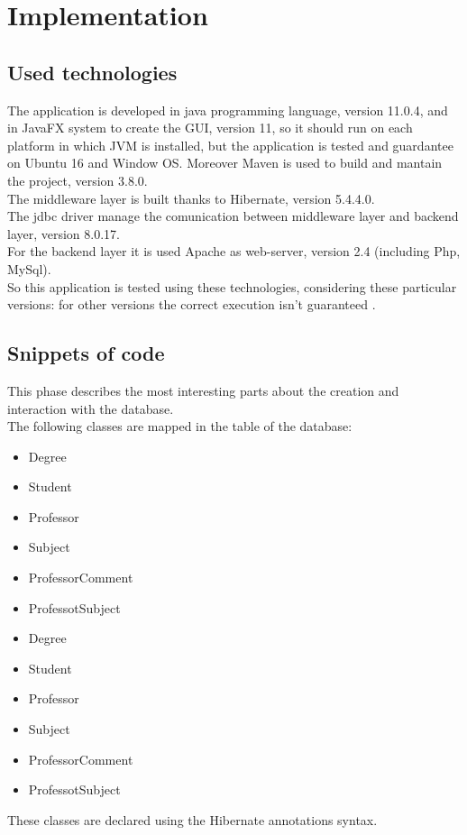 \documentclass[a4paper, oneside]{article}
\begin{document}
\vspace{19mm}



\clearpage



\section{Implementation}
\subsection{Used technologies}
The application is developed in java programming language, version 11.0.4, and in JavaFX system to create the GUI, version 11, so it should run on each platform in which JVM is installed, but the application is tested and guardantee on Ubuntu 16 and Window OS. Moreover Maven is used  to build and mantain the project, version 3.8.0. \\
The middleware layer is built thanks to Hibernate, version 5.4.4.0.\\
The jdbc driver manage the comunication between middleware layer and backend layer, version 8.0.17.\\ 
For the backend layer it is used Apache as web-server, version 2.4 (including Php, MySql).\\
So this application is tested using these technologies, considering these particular versions: for other versions the correct execution isn't guaranteed .
\subsection{Snippets of code}
This phase describes the most interesting parts about the creation and interaction with the database.\\
The following classes are mapped in the table of the database: 

\begin{itemize}	
\item Degree
\item Student
\item Professor
\item Subject
\item ProfessorComment
\item ProfessotSubject
\end{itemize}


\begin{itemize}	
\item Degree
\item Student
\item Professor
\item Subject
\item ProfessorComment
\item ProfessotSubject
\end{itemize}
These classes are declared using the Hibernate annotations syntax.\\
\end{document}
